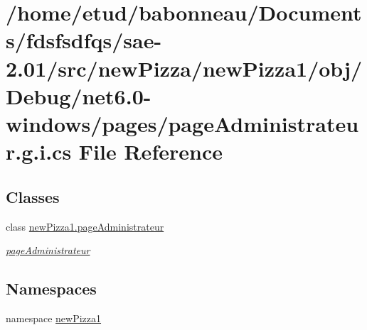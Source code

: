 \hypertarget{net6_80-windows_2pages_2pageAdministrateur_8g_8i_8cs}{}\section{/home/etud/babonneau/\+Documents/fdsfsdfqs/sae-\/2.01/src/new\+Pizza/new\+Pizza1/obj/\+Debug/net6.0-\/windows/pages/page\+Administrateur.g.\+i.\+cs File Reference}
\label{net6_80-windows_2pages_2pageAdministrateur_8g_8i_8cs}
\subsection*{Classes}
\begin{DoxyCompactItemize}
\item 
class \hyperlink{classnewPizza1_1_1pageAdministrateur}{new\+Pizza1.\+page\+Administrateur}
\begin{DoxyCompactList}\small\item\em \hyperlink{classnewPizza1_1_1pageAdministrateur}{page\+Administrateur} \end{DoxyCompactList}\end{DoxyCompactItemize}
\subsection*{Namespaces}
\begin{DoxyCompactItemize}
\item 
namespace \hyperlink{namespacenewPizza1}{new\+Pizza1}
\end{DoxyCompactItemize}
